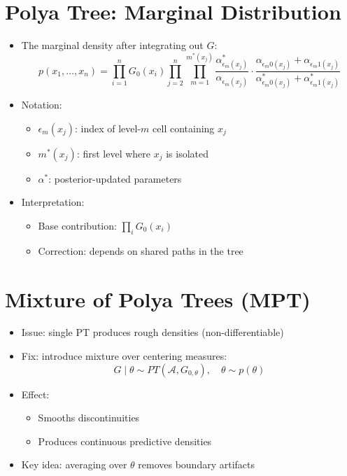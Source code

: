 \documentclass[12pt,oneside]{book}
\numberwithin{equation}{section}
\theoremstyle{definition}
\theoremstyle{plain}
\theoremstyle{remark}
\begin{document}
\section{Polya Tree: Marginal Distribution}

\begin{itemize}
\item The marginal density after integrating out $G$:
\[
p(x_1,\dots,x_n)
=
\prod_{i=1}^n G_0(x_i)
\prod_{j=2}^n
\prod_{m=1}^{m^*(x_j)}
\frac{\alpha_{\epsilon_m(x_j)}^*}{\alpha_{\epsilon_m(x_j)}}
\cdot
\frac{\alpha_{\epsilon_m 0(x_j)} + \alpha_{\epsilon_m 1(x_j)}}
{\alpha_{\epsilon_m 0(x_j)}^* + \alpha_{\epsilon_m 1(x_j)}^*}
\]

\item Notation:
\begin{itemize}
\item $\epsilon_m(x_j)$: index of level-$m$ cell containing $x_j$
\item $m^*(x_j)$: first level where $x_j$ is isolated
\item $\alpha^*$: posterior-updated parameters
\end{itemize}

\item Interpretation:
\begin{itemize}
\item Base contribution: $\prod_i G_0(x_i)$
\item Correction: depends on shared paths in the tree
\end{itemize}
\end{itemize}

\section{Mixture of Polya Trees (MPT)}

\begin{itemize}
\item Issue: single PT produces rough densities (non-differentiable)

\item Fix: introduce mixture over centering measures:
\[
G \mid \theta \sim PT(\mathcal{A}, G_{0,\theta}), \quad \theta \sim p(\theta)
\]

\item Effect:
\begin{itemize}
\item Smooths discontinuities
\item Produces continuous predictive densities
\end{itemize}

\item Key idea: averaging over $\theta$ removes boundary artifacts
\end{itemize}
\end{document}
